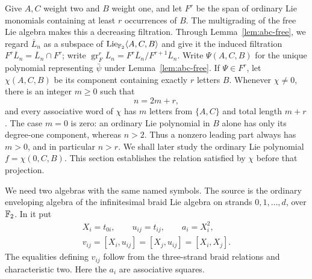 Give $A,C$ weight two and $B$ weight one, and let $F^r$ be the span of
ordinary Lie monomials containing at least $r$ occurrences of $B$.
The multigrading of the free Lie algebra makes this a decreasing
filtration.  Through Lemma~\ref{lem:abc-free}, we regard
$\overline L_n$ as a subspace of
$\operatorname{Lie}_{{\mathbb F_2}}\langle A,C,B\rangle$ and give it the induced filtration
$F^r\overline L_n=\overline L_n\cap F^r$; write
$\operatorname{gr}^r_F\overline L_n=
F^r\overline L_n/F^{r+1}\overline L_n$.
Write $\Psi(A,C,B)$ for the unique polynomial representing
$\bar\psi$ under Lemma~\ref{lem:abc-free}.  If $\Psi\in F^r$, let
$\chi(A,C,B)$ be its component containing exactly $r$ letters $B$.
Whenever $\chi\ne0$, there is an integer $m\geq0$ such that
\begin{equation}\label{eq:leading-count-weight}
 n=2m+r,
\end{equation}
and every associative word of $\chi$ has $m$ letters from $\{A,C\}$
and total length $m+r$.  The case $m=0$ is zero: an ordinary Lie
polynomial in $B$ alone has only its degree-one component, whereas
$n>2$.  Thus a nonzero leading part always has $m>0$, and in particular
$n>r$.  We shall later study the ordinary Lie polynomial
$f=\chi(0,C,B)$.  This section establishes the relation satisfied by
$\chi$ before that projection.

We need two algebras with the same named symbols.  The source is the
ordinary enveloping algebra of the infinitesimal braid Lie algebra
on strands $0,1,\ldots,d$, over ${\mathbb F_2}$.  In it put
\begin{equation}\label{eq:source-symbols}
\begin{gathered}
 X_i=t_{0i},\qquad u_{ij}=t_{ij},\qquad
 a_i=X_i^2,\\
 v_{ij}=[X_i,u_{ij}]=[X_j,u_{ij}]=[X_i,X_j].
\end{gathered}
\end{equation}
The equalities defining $v_{ij}$ follow from the three-strand braid
relations and characteristic two.  Here the $a_i$ are associative
squares.

